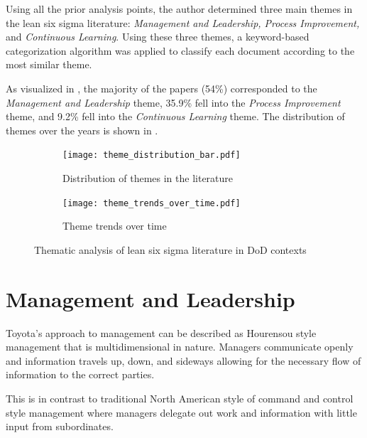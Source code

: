 \documentclass{article}
\begin{document}
	Using all the prior analysis points, the author determined three main themes in the lean six sigma literature: \textit{Management and Leadership, Process Improvement,} and \textit{Continuous Learning}. 
	Using these three themes, a keyword-based categorization algorithm was applied to classify each document according to the most similar theme.

	As visualized in , the majority of the papers (54\%) corresponded to the \textit{Management and Leadership} theme, 35.9\% fell into the \textit{Process Improvement} theme, and 9.2\% fell into the \textit{Continuous Learning} theme.
	The distribution of themes over the years is shown in .

	\begin{figure}[htbp]
		\centering
		\begin{subfigure}[b]{0.48\textwidth}
			\centering
			\texttt{[image: theme\_distribution\_bar.pdf]}
			\caption{Distribution of themes in the literature}
			\label{fig:theme_distribution_bar}
		\end{subfigure}
		\hfill
		\begin{subfigure}[b]{0.48\textwidth}
			\centering
			\texttt{[image: theme\_trends\_over\_time.pdf]}
			\caption{Theme trends over time}
			\label{fig:theme_trends}
		\end{subfigure}
		\caption{Thematic analysis of lean six sigma literature in DoD contexts}
		\label{fig:theme_analysis}
	\end{figure}

	\section{Management and Leadership}

		Toyota's approach to management can be described as Hourensou style management that is multidimensional in nature.
		Managers communicate openly and information travels up, down, and sideways allowing for the necessary flow of information to the correct parties. 

		This is in contrast to traditional North American style of command and control style management where managers delegate out work and information with little input from subordinates.
\end{document}
